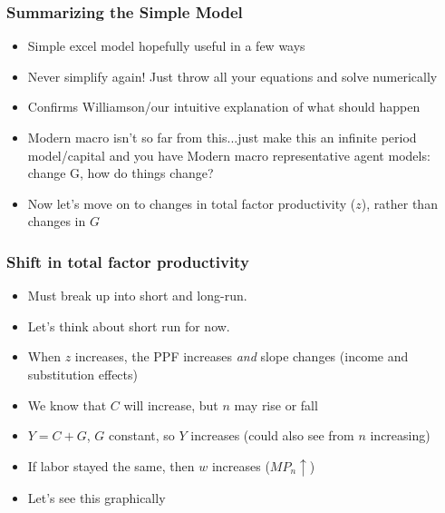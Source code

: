 \documentclass{beamer}
\begin{document}
\begin{frame}
\frametitle[alignment=center]{Summarizing the Simple Model}
\begin{itemize}
\item Simple excel model hopefully useful in a few ways
\bigskip
\item Never simplify again!  Just throw all your equations and solve numerically 
\bigskip
\item Confirms Williamson/our intuitive explanation of what should happen
\bigskip
\item Modern macro isn't so far from this...just make this an infinite period model/capital and you have Modern macro representative agent models: change G, how do things change?
\bigskip
\item Now let's move on to changes in total factor productivity ($z$), rather than changes in $G$
\end{itemize}
\end{frame}

\begin{frame}
\frametitle[alignment=center]{Shift in total factor productivity}
\begin{itemize}
\item Must break up into short and long-run.
\bigskip
\item Let's think about short run for now.
\bigskip
\item When $z$ increases, the PPF increases \emph{and} slope changes (income and substitution effects)
\bigskip
\item We know that $C$ will increase, but $n$ may rise or fall
\bigskip
\item $Y=C+G$, $G$ constant, so $Y$ increases (could also see from $n$ increasing)
\bigskip
\item If labor stayed the same, then $w$ increases ($MP_n\uparrow$) 
\bigskip
\item Let's see this graphically
\end{itemize}
\end{frame}
\end{document}
